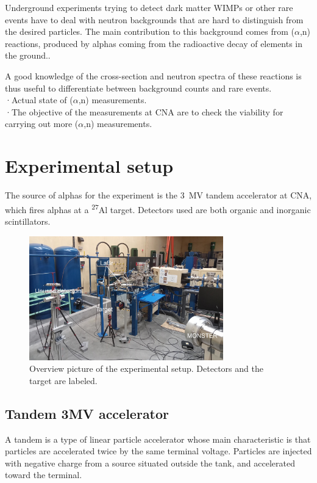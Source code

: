 \documentclass[a4paper,12pt]{report}
\newcommand{\an}{($\alpha$,n) }
\newcommand{\Aliso}{\textsuperscript{27}Al }
\begin{document}
Underground experiments trying to detect dark matter WIMPs or other rare events have to deal with neutron backgrounds that are hard to distinguish from the desired particles.
The main contribution to this background comes from \an reactions, produced by alphas coming from the radioactive decay of elements in the ground.\cite{neutron_in_an}.	%

A good knowledge of the cross-section and neutron spectra of these reactions is thus useful to differentiate between background counts and rare events.
\\

·Actual state of \an measurements.\\

·The objective of the measurements at CNA are to check the viability for carrying out more \an measurements.\\


\chapter{Experimental setup}
The source of alphas for the experiment is the \qty{3}{\mega\volt} tandem accelerator at CNA, which fires alphas at a \Aliso target.
Detectors used are both organic and inorganic scintillators.

\begin{figure}[H]
	\centering
	\includegraphics[width=0.75\textwidth]{overview_photo.jpg}
	\caption{Overview picture of the experimental setup.
	Detectors and the target are labeled.}
	\label{overview_photo}
\end{figure}

\section{Tandem 3MV accelerator}
A tandem is a type of linear particle accelerator whose main characteristic is that particles are accelerated twice by the same terminal voltage.
Particles are injected with negative charge from a source situated outside the tank, and accelerated toward the terminal.
\end{document}
